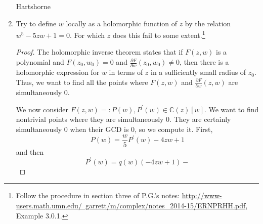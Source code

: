 \documentclass{article}
\begin{document}
\begin{enumerate}
	Hartshorne
	
	\item Try to define $w$ locally as a holomorphic function of $z$ by the relation $w^5 - 5zw + 1 = 0$. For 
	which $z$ does this fail to some extent.\footnote{Follow the procedure in section three of P.G.'s notes: \href{http://www-users.math.umn.edu/~garrett/m/complex/notes\_2014-15/ERNPRHH.pdf}{http://www-users.math.umn.edu/~garrett/m/complex/notes\_2014-15/ERNPRHH.pdf}, Example 3.0.1.}
	
	\begin{proof}
		The holomorphic inverse theorem states that if $F(z,w)$ is a polynomial and $F(z_0,w_0)=0$ and
		$\frac{\partial F}{\partial w} (z_0, w_0) \neq 0$, then there is a holomorphic expression for $w$ in 
		terms of $z$ in a sufficiently small radius of $z_0$.
		Thus, we want to find all the points where
		$F(z,w)$ and $\frac{\partial F}{\partial w}(z,w)$ are simultaneously $0$.
		
		We now consider $F(z,w) =: P(w), P^\prime(w) \in \mathbb{C}(z)[w]$. We want to find nontrivial
		points where they are simultaneously $0$.
		They are certainly simultaneously $0$ when their GCD is $0$, so we compute it.
		First,
		\[ P(w) = \frac{w}{5} P^\prime(w) - 4zw +1 \]
		and then
		\[ P^\prime(w) = q(w) (-4zw + 1) - \]
	\end{proof}
	
\end{enumerate}
\end{document}
